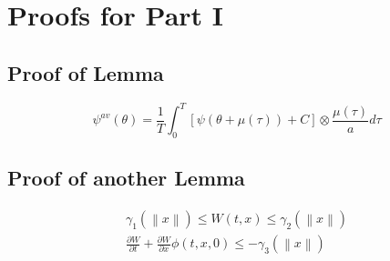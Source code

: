 
\chapter{Proofs for Part I} %

\label{AppendixA} %

\section{Proof of Lemma}
\label{pf:ApprGradSys}

$$\psi^{av}(\theta)=\frac{1}{T}\int^{T}_0[\psi(\theta+\mu(\tau))+C]\otimes\frac{\mu(\tau)}{a}d\tau$$ 



\section{Proof of another Lemma}
\begin{equation}
\begin{aligned}
\gamma_1(\left\|x\right\|)\leq W(t,x)\leq \gamma_2(\left\|x\right\|)\\
\frac{\partial{W}}{\partial{t}}+\frac{\partial{W}}{\partial{x}}\phi(t,x,0)\leq-\gamma_3(\left\|x\right\|)
\end{aligned}
\end{equation}
